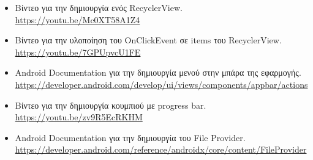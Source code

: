 \documentclass[12pt]{article}
\begin{document}
	\begin{itemize}
		\item Βίντεο για την δημιουργία ενός RecyclerView.\\
		\url{https://youtu.be/Mc0XT58A1Z4}
		
		\item Βίντεο για την υλοποίηση του OnClickEvent σε items του RecyclerView.\\
		\url{https://youtu.be/7GPUpvcU1FE}
		
		\item Android Documentation για την δημιουργία μενού στην μπάρα της εφαρμογής.\\
		\url{https://developer.android.com/develop/ui/views/components/appbar/actions}
		
		\item Βίντεο για την δημιουργία κουμπιού με progress bar.\\
		\url{https://youtu.be/zv9R5EcRKHM}
		
		\item Android Documentation για την δημιουργία του File Provider.\\
		\url{https://developer.android.com/reference/androidx/core/content/FileProvider}
	\end{itemize}
	
	
	
\end{document}
